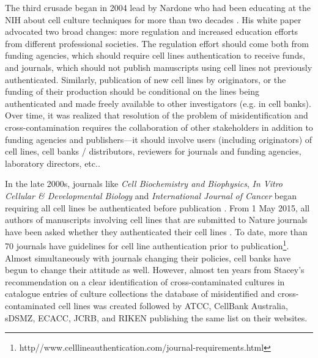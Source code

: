 \documentclass[12pt]{article}
\begin{document}
The third crusade began in 2004 lead by Nardone\added{,} who had been educating at the NIH about cell culture techniques for more than two decades \cite{nardone2007eradication}. His white paper advocated two broad changes: more regulation and increased education efforts from different professional societies. The regulation effort should come both from funding agencies, which should require cell lines authentication to receive funds, and journals, which should not publish manuscripts using cell lines not previously authenticated. Similarly, publication of new cell lines by originators, or the funding of their production should be conditional on the lines being authenticated and made freely available to other investigators (e.g. in cell banks). Over time, it was realized that resolution of the problem of misidentification and cross-contamination requires the collaboration of other stakeholders in addition to funding agencies and publishers---it should involve users (including originators) of cell lines, cell banks / distributors, reviewers for journals and funding agencies, laboratory directors, etc.. 


In the late 2000s, journals like \textit{Cell Biochemistry and Biophysics}, \textit{In Vitro Cellular \& Developmental Biology} and \textit{International Journal of Cancer} began requiring all cell lines be authenticated before publication \cite{american2010cell}. From 1 May 2015, all authors of manuscripts involving cell lines that are submitted to Nature journals have been asked whether they authenticated their cell lines \cite{editorial2015time}. To date, more than 70 journals have guidelines for cell line authentication prior to publication\footnote{http//www.celllineauthentication.com/journal-requirements.html}. Almost simultaneously with journals changing their policies, cell banks have begun to change their attitude as well. However,  almost ten years\added{,} from Stacey's recommendation on a clear identification of cross-contaminated cultures in catalogue entries of culture collections \cite{stacey2000cell}\added{,}  the database of misidentified and cross-contaminated cell lines was created  \cite{capes2010check} followed by ATCC, CellBank Australia, sDSMZ, ECACC, JCRB, and RIKEN publishing the same list on their websites.
\end{document}
